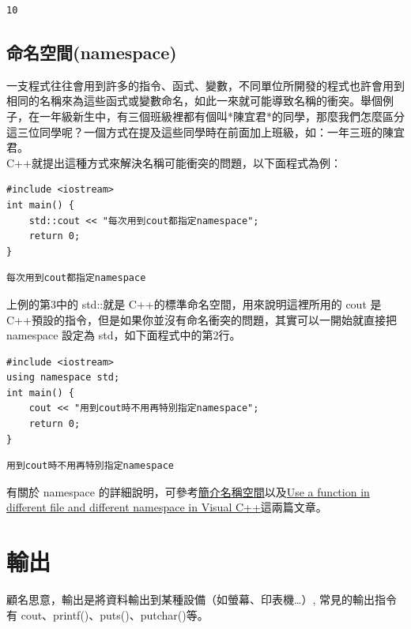 \documentclass[a4paper,12pt]{article}
\begin{document}
\begin{verbatim}
10
\end{verbatim}
\subsection{命名空間(namespace)}
\label{sec:org0583639}
一支程式往往會用到許多的指令、函式、變數，不同單位所開發的程式也許會用到相同的名稱來為這些函式或變數命名，如此一來就可能導致名稱的衝突。舉個例子，在一年級新生中，有三個班級裡都有個叫*陳宜君*的同學，那麼我們怎麼區分這三位同學呢？一個方式在提及這些同學時在前面加上班級，如：一年三班的陳宜君。\\

C++就提出這種方式來解決名稱可能衝突的問題，以下面程式為例：\\
\lstset{breaklines=true,language=cpp,label= ,caption= ,captionpos=b,firstnumber=1,numbers=left}
\begin{lstlisting}
#include <iostream>
int main() {
    std::cout << "每次用到cout都指定namespace";
    return 0;
}
\end{lstlisting}

\begin{verbatim}
每次用到cout都指定namespace
\end{verbatim}


上例的第3中的 std::就是 C++的標準命名空間，用來說明這裡所用的 cout 是 C++預設的指令，但是如果你並沒有命名衝突的問題，其實可以一開始就直接把 namespace 設定為 std，如下面程式中的第2行。\\
\lstset{breaklines=true,language=cpp,label= ,caption= ,captionpos=b,firstnumber=1,numbers=left}
\begin{lstlisting}
#include <iostream>
using namespace std;
int main() {
    cout << "用到cout時不用再特別指定namespace";
    return 0;
}
\end{lstlisting}

\begin{verbatim}
用到cout時不用再特別指定namespace
\end{verbatim}


有關於 namespace 的詳細說明，可參考\href{https://openhome.cc/Gossip/CppGossip/Namespace.html}{簡介名稱空間}以及\href{https://stackoverflow.com/questions/37693999/use-a-function-in-different-file-and-different-namespace-in-visual-c}{Use a function in different file and different namespace in Visual C++}這兩篇文章。\\
\newpage

\section{輸出}
\label{cpp_output}
顧名思意，輸出是將資料輸出到某種設備（如螢幕、印表機\ldots{}）, 常見的輸出指令有 cout、printf()、puts()、putchar()等。\\
\end{document}

